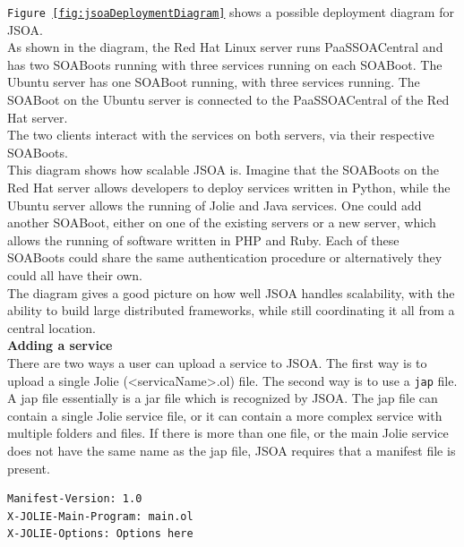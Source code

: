 \documentclass[12pt,a4paper]{article}
\begin{document}
\texttt{Figure \ref{fig:jsoaDeploymentDiagram}} shows a possible deployment diagram for JSOA.\\
As shown in the diagram, the Red Hat Linux server runs PaaSSOACentral and has two SOABoots running with three services running on each SOABoot. The Ubuntu server has one SOABoot running, with three services running. The SOABoot on the Ubuntu server is connected to the PaaSSOACentral of the Red Hat server.\\
The two clients interact with the services on both servers, via their respective SOABoots.\\

This diagram shows how scalable JSOA is. Imagine that the SOABoots on the Red Hat server allows developers to deploy services written in Python, while the Ubuntu server allows the running of Jolie and Java services. One could add another SOABoot, either on one of the existing servers or a new server, which allows the running of software written in PHP and Ruby. Each of these SOABoots could share the same authentication procedure or alternatively they could all have their own.\\
The diagram gives a good picture on how well JSOA handles scalability, with the ability to build large distributed frameworks, while still coordinating it all from a central location. \\

\newpage
\textbf{Adding a service} \\
There are two ways a user can upload a service to JSOA. The first way is to upload a single Jolie (\textless servicaName\textgreater .ol) file. The second way is to use a \texttt{jap} file.\\
A jap file essentially is a jar file which is recognized by JSOA. The jap file can contain a single Jolie service file, or it can contain a more complex service with multiple folders and files. If there is more than one file, or the main Jolie service does not have the same name as the jap file, JSOA requires that a manifest file is present.

\begin{lstlisting}[caption={Jap file manifest},label={lst:japManifest}]
Manifest-Version: 1.0                                                                                                                                                                                        
X-JOLIE-Main-Program: main.ol                                                                                                                                                                                
X-JOLIE-Options: Options here 
\end{lstlisting}
\end{document}
